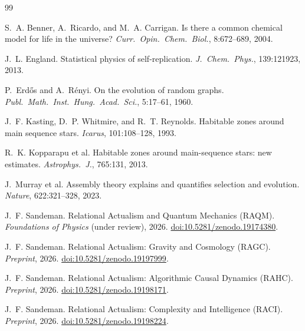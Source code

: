 \documentclass[11pt,a4paper]{article}
\theoremstyle{plain}
\theoremstyle{definition}
\theoremstyle{remark}
\begin{document}
\begin{thebibliography}{99}

S.~A. Benner, A.~Ricardo, and M.~A. Carrigan.
\newblock Is there a common chemical model for life in the universe?
\newblock \textit{Curr.\ Opin.\ Chem.\ Biol.}, 8:672--689, 2004.

J.~L. England.
\newblock Statistical physics of self-replication.
\newblock \textit{J.\ Chem.\ Phys.}, 139:121923, 2013.

P.~Erd\H{o}s and A.~R\'{e}nyi.
\newblock On the evolution of random graphs.
\newblock \textit{Publ.\ Math.\ Inst.\ Hung.\ Acad.\ Sci.}, 5:17--61, 1960.

J.~F. Kasting, D.~P. Whitmire, and R.~T. Reynolds.
\newblock Habitable zones around main sequence stars.
\newblock \textit{Icarus}, 101:108--128, 1993.

R.~K. Kopparapu et al.
\newblock Habitable zones around main-sequence stars: new estimates.
\newblock \textit{Astrophys.\ J.}, 765:131, 2013.

J.~Murray et al.
\newblock Assembly theory explains and quantifies selection and evolution.
\newblock \textit{Nature}, 622:321--328, 2023.

J.~F. Sandeman.
\newblock Relational Actualism and Quantum Mechanics (RAQM).
\newblock \textit{Foundations of Physics} (under review), 2026.
\newblock \href{https://doi.org/10.5281/zenodo.19174380}{doi:10.5281/zenodo.19174380}.

J.~F. Sandeman.
\newblock Relational Actualism: Gravity and Cosmology (RAGC).
\newblock \textit{Preprint}, 2026.
\newblock \href{https://doi.org/10.5281/zenodo.19197999}{doi:10.5281/zenodo.19197999}.

J.~F. Sandeman.
\newblock Relational Actualism: Algorithmic Causal Dynamics (RAHC).
\newblock \textit{Preprint}, 2026.
\newblock \href{https://doi.org/10.5281/zenodo.19198171}{doi:10.5281/zenodo.19198171}.

J.~F. Sandeman.
\newblock Relational Actualism: Complexity and Intelligence (RACI).
\newblock \textit{Preprint}, 2026.
\newblock \href{https://doi.org/10.5281/zenodo.19198224}{doi:10.5281/zenodo.19198224}.


\end{thebibliography}
\end{document}
